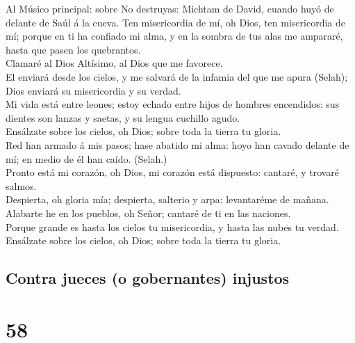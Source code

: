  Al Músico principal: sobre No destruyas: Michtam de
David, cuando huyó de delante de Saúl á la cueva. Ten misericordia de
mí, oh Dios, ten misericordia de mí; porque en ti ha confiado mi alma, y
en la sombra de tus alas me ampararé, hasta que pasen los quebrantos.\\
 Clamaré al Dios Altísimo, al Dios que me favorece.\\
 El enviará desde los cielos, y me salvará de la infamia
del que me apura (Selah); Dios enviará su misericordia y su verdad.\\
 Mi vida está entre leones; estoy echado entre hijos de
hombres encendidos: sus dientes son lanzas y saetas, y su lengua
cuchillo agudo.\\
 Ensálzate sobre los cielos, oh Dios; sobre toda la tierra
tu gloria.\\
 Red han armado á mis pasos; hase abatido mi alma: hoyo
han cavado delante de mí; en medio de él han caído. (Selah.)\\
 Pronto está mi corazón, oh Dios, mi corazón está
dispuesto: cantaré, y trovaré salmos.\\
 Despierta, oh gloria mía; despierta, salterio y arpa:
levantaréme de mañana.\\
 Alabarte he en los pueblos, oh Señor; cantaré de ti en
las naciones.\\
 Porque grande es hasta los cielos tu misericordia, y
hasta las nubes tu verdad.\\
 Ensálzate sobre los cielos, oh Dios; sobre toda la
tierra tu gloria.

\hypertarget{contra-jueces-o-gobernantes-injustos}{%
\subsection{Contra jueces (o gobernantes)
injustos}\label{contra-jueces-o-gobernantes-injustos}}

\hypertarget{section-19-58}{%
\section{58}\label{section-19-58}}


